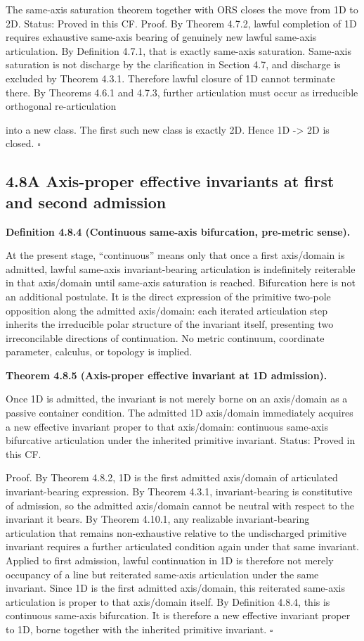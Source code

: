\documentclass[11pt]{article}
\begin{document}
The same-axis saturation theorem together with ORS closes the move from 1D to 2D. Status: Proved in this CF. Proof. By Theorem 4.7.2, lawful completion of 1D requires exhaustive same-axis bearing of genuinely new lawful same-axis articulation. By Definition 4.7.1, that is exactly same-axis saturation. Same-axis saturation is not discharge by the clarification in Section 4.7, and discharge is excluded by Theorem 4.3.1. Therefore lawful closure of 1D cannot terminate there. By Theorems 4.6.1 and 4.7.3, further articulation must occur as irreducible orthogonal re-articulation

into a new class. The first such new class is exactly 2D. Hence 1D -\textgreater{} 2D is closed. $\square$

\subsection{4.8A Axis-proper effective invariants at first and second admission}\label{a-axis-proper-effective-invariants-at-first-and-second-admission}

\textbf{Definition 4.8.4 (Continuous same-axis bifurcation, pre-metric sense).}

At the present stage, ``continuous'' means only that once a first axis/domain is admitted, lawful same-axis invariant-bearing articulation is indefinitely reiterable in that axis/domain until same-axis saturation is reached. Bifurcation here is not an additional postulate. It is the direct expression of the primitive two-pole opposition along the admitted axis/domain: each iterated articulation step inherits the irreducible polar structure of the invariant itself, presenting two irreconcilable directions of continuation. No metric continuum, coordinate parameter, calculus, or topology is implied.

\textbf{Theorem 4.8.5 (Axis-proper effective invariant at 1D admission).}

Once 1D is admitted, the invariant is not merely borne on an axis/domain as a passive container condition. The admitted 1D axis/domain immediately acquires a new effective invariant proper to that axis/domain: continuous same-axis bifurcative articulation under the inherited primitive invariant. Status: Proved in this CF.

Proof. By Theorem 4.8.2, 1D is the first admitted axis/domain of articulated invariant-bearing expression. By Theorem 4.3.1, invariant-bearing is constitutive of admission, so the admitted axis/domain cannot be neutral with respect to the invariant it bears. By Theorem 4.10.1, any realizable invariant-bearing articulation that remains non-exhaustive relative to the undischarged primitive invariant requires a further articulated condition again under that same invariant. Applied to first admission, lawful continuation in 1D is therefore not merely occupancy of a line but reiterated same-axis articulation under the same invariant. Since 1D is the first admitted axis/domain, this reiterated same-axis articulation is proper to that axis/domain itself. By Definition 4.8.4, this is continuous same-axis bifurcation. It is therefore a new effective invariant proper to 1D, borne together with the inherited primitive invariant. $\square$
\end{document}
